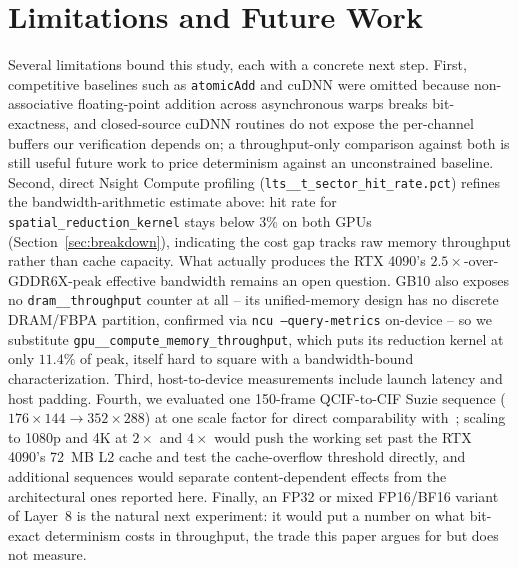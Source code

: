 \documentclass[conference]{IEEEtran}
\begin{document}
\section{Limitations and Future Work}
\label{sec:limitations}
Several limitations bound this study, each with a concrete next step. First, competitive baselines such as \texttt{atomicAdd} and cuDNN were omitted because non-associative floating-point addition across asynchronous warps breaks bit-exactness, and closed-source cuDNN routines do not expose the per-channel buffers our verification depends on; a throughput-only comparison against both is still useful future work to price determinism against an unconstrained baseline. Second, direct Nsight Compute profiling (\texttt{lts\_\_t\_sector\_hit\_rate.pct}) refines the bandwidth-arithmetic estimate above: hit rate for \texttt{spatial\_reduction\_kernel} stays below $3\%$ on both GPUs (Section~\ref{sec:breakdown}), indicating the cost gap tracks raw memory throughput rather than cache capacity. What actually produces the RTX 4090's $2.5\times$-over-GDDR6X-peak effective bandwidth remains an open question. GB10 also exposes no \texttt{dram\_\_throughput} counter at all -- its unified-memory design has no discrete DRAM/FBPA partition, confirmed via \texttt{ncu~--query-metrics} on-device -- so we substitute \texttt{gpu\_\_compute\_memory\_throughput}, which puts its reduction kernel at only $11.4\%$ of peak, itself hard to square with a bandwidth-bound characterization. Third, host-to-device measurements include launch latency and host padding. Fourth, we evaluated one 150-frame QCIF-to-CIF Suzie sequence ($176{\times}144 \rightarrow 352{\times}288$) at one scale factor for direct comparability with~\cite{annisa2025}; scaling to 1080p and 4K at $2\times$ and $4\times$ would push the working set past the RTX 4090's 72~MB L2 cache and test the cache-overflow threshold directly, and additional sequences would separate content-dependent effects from the architectural ones reported here. Finally, an FP32 or mixed FP16/BF16 variant of Layer~8 is the natural next experiment: it would put a number on what bit-exact determinism costs in throughput, the trade this paper argues for but does not measure.

\end{document}
